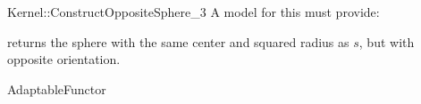 \begin{ccRefFunctionObjectConcept}{Kernel::ConstructOppositeSphere_3}
A model for this must provide:


{ returns the sphere with the same center and squared radius as
  $s$, but with opposite orientation.}

\ccRefines
AdaptableFunctor

\ccSeeAlso
{} \\

\end{ccRefFunctionObjectConcept}
